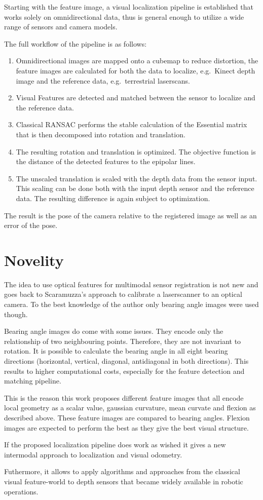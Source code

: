 Starting with the feature image, a visual localization pipeline is
established that works solely on omnidirectional data, thus is general
enough to utilize a wide range of sensors and camera models.

The full workflow of the pipeline is as follows:

\begin{enumerate}
\item Omnidirectional images are mapped onto a cubemap to reduce distortion,
  the feature images are calculated for both the data to localize,
  e.g.~Kinect depth image and the reference data, e.g.~terrestrial
  laserscans.
\item Visual Features are detected and matched between the sensor to
  localize and the reference data.
\item Classical RANSAC performs the stable calculation of the
  Essential matrix that is then decomposed into rotation and translation.
\item The resulting rotation and translation is optimized. The objective
  function is the distance of the detected features to the epipolar
  lines.
\item The unscaled translation is scaled with the depth data from the sensor
  input. This scaling can be done both with the input depth sensor and
  the reference data. The resulting difference is again subject to
  optimization.
\end{enumerate}

The result is the pose of the camera relative to the registered image as well as an error of the pose.

\section{Novelity}\label{novelity}

The idea to use optical features for multimodal sensor registration is
not new and goes back to Scaramuzza's approach to calibrate a
laserscanner to an optical camera. To the best knowledge of the author
only bearing angle images were used though.

Bearing angle images do come with some issues. They encode only the
relationship of two neighbouring points. Therefore, they are not
invariant to rotation. It is possible to calculate the bearing angle in
all eight bearing directions (horizontal, vertical, diagonal, antidiagonal in
both directions). This results to higher computational costs, especially
for the feature detection and matching pipeline.

This is the reason this work proposes different feature images that all
encode local geometry as a scalar value, gaussian curvature, mean
curvate and flexion as described above. These feature images are
compared to bearing angles. Flexion images are expected to perform the best
as they give the best visual structure.

If the proposed localization pipeline does work as wished it gives a new
intermodal approach to localization and visual odometry.

Futhermore, it allows to apply algorithms and approaches from the
classical visual feature-world to depth sensors that became widely
available in robotic operations.
